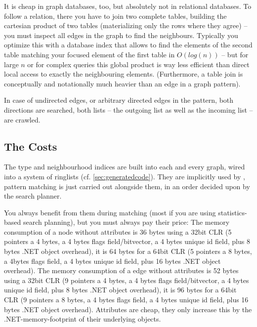 It is cheap in graph databases, too, but absolutely not in relational databases.
To follow a relation, there you have to join two complete tables, building the cartesian product of two tables (materializing only the rows where they agree) -- you must inspect all edges in the graph to find the neighbours.
Typically you optimize this with a database index that allows to find the elements of the second table matching your focused element of the first table in $O(log(n))$ -- but for large $n$ or for complex queries this global product is way less efficient than direct local access to exactly the neighbouring elements.
(Furthermore, a table join is conceptually and notationally much heavier than an edge in a graph pattern).

In case of undirected edges, or arbitrary directed edges in the pattern, both directions are searched,
both lists -- the outgoing list as well as the incoming list -- are crawled.

\pagebreak %

\subsection{The Costs}\label{sec:performancememory} 
The type and neighbourhood indices are built into each and every \GrG{} graph, wired into a system of ringlists (cf. \ref{sec:generatedcode}).
They are implicitly used by \GrG{}, pattern matching is just carried out alongside them, in an order decided upon by the search planner. 

You always benefit from them during matching (most if you are using statistics-based search planning), but you must always pay their price:
The memory consumption of a \GrG{} node without attributes is 36 bytes using a 32bit CLR (5 pointers a 4 bytes, a 4 bytes flags field/bitvector, a 4 bytes unique id field, plus 8 bytes .NET object overhead), it is 64 bytes for a 64bit CLR (5 pointers a 8 bytes, a 4bytes flags field, a 4 bytes unique id field, plus 16 bytes .NET object overhead).
The memory consumption of a \GrG{} edge without attributes is 52 bytes using a 32bit CLR (9 pointers a 4 bytes, a 4 bytes flags field/bitvector, a 4 bytes unique id field, plus 8 bytes .NET object overhead), it is 96 bytes for a 64bit CLR (9 pointers a 8 bytes, a 4 bytes flags field, a 4 bytes unique id field, plus 16 bytes .NET object overhead).
Attributes are cheap, they only increase this by the .NET-memory-footprint of their underlying objects.

